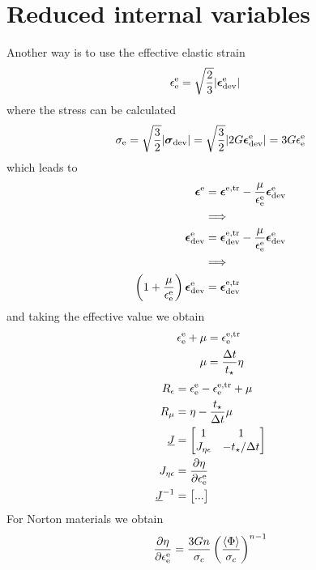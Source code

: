 \documentclass[a4paper,11pt]{article}
\newcommand{\ts}[1]{\text{\boldmath $#1$}}
\newcommand{\pderiv}[2]{\frac{\partial #1}{\partial #2}}
\providecommand{\abs}[1]{\lvert#1\rvert}
\newcommand{\dev}{{\rm dev}}
\newcommand{\rme}{{\rm e}}
\begin{document}
\section{Reduced internal variables}

Another way is to use the effective elastic strain
\begin{align}
	\epsilon_\rme^\rme &= \sqrt{\frac23}\abs{\ts\epsilon^\rme_\dev}
\end{align}
where the stress can be calculated
\begin{align}
 \sigma_\rme = \sqrt{\frac32}\abs{\ts\sigma_\dev} = \sqrt{\frac32}\abs{2 G\ts\epsilon^\rme_\dev} = 3G\epsilon_\rme^\rme
\end{align}
which leads to
\begin{align}
\nonumber \ts\epsilon^\rme &= \ts\epsilon^{\rm e,tr}-\frac{\mu}{\epsilon_\rme^\rme}\ts\epsilon_\dev^\rme\\
\nonumber & \Longrightarrow\\
\nonumber \ts\epsilon^\rme_\dev &= \ts\epsilon^{\rm e,tr}_\dev-\frac{\mu}{\epsilon_\rme^\rme}\ts\epsilon_\dev^\rme\\
\nonumber & \Longrightarrow\\
 \left(1+\frac{\mu}{\epsilon_\rme^\rme}\right)\ts\epsilon^\rme_\dev &= \ts\epsilon^{\rm e,tr}_\dev
\end{align}
and taking the effective value we obtain
\begin{align}
	\epsilon_\rme^\rme + \mu &= \epsilon_\rme^{\rm e,tr}\\
	\mu &= \frac{\Delta t}{t_\star} \eta
\end{align}
\begin{align}
	R_\epsilon &= \epsilon_\rme^\rme -\epsilon_\rme^{\rm e,tr} +\mu\\
	R_\mu &= \eta - \frac{t_\star}{\Delta t}\mu\\
    \underline{J} &= \begin{bmatrix}1 & 1 \\ J_{\eta\epsilon} & -t_\star/\Delta t\end{bmatrix}\\
    J_{\eta\epsilon} &= \pderiv{\eta}{\epsilon_\rme^\rme} \label{eq:Jue}\\
    \underline{J}^{-1} &= \begin{bmatrix}...\end{bmatrix}
\end{align}
For Norton materials we obtain
\begin{align}
    \pderiv{\eta}{\epsilon_\rme^\rme} = \frac{3 G n}{\sigma_c} \left(\frac{\langle\Phi\rangle}{\sigma_c}\right)^{n-1}
\end{align}
\end{document}
